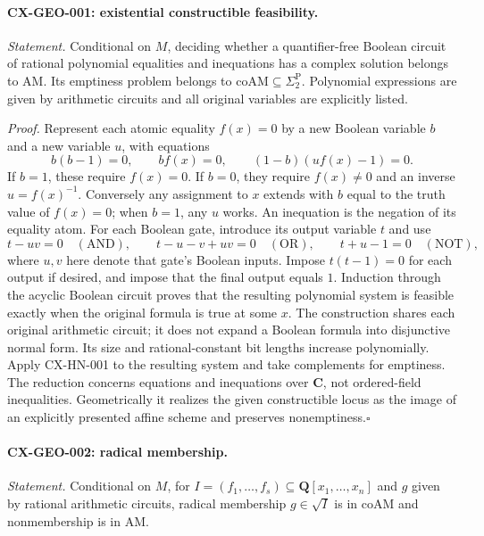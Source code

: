 \documentclass[11pt,a4paper]{article}
\begin{document}
\paragraph{CX-GEO-001: existential constructible feasibility.}
\emph{Statement.} Conditional on $M$, deciding whether a quantifier-free
Boolean circuit of rational polynomial equalities and inequations has a
complex solution belongs to $\mathrm{AM}$. Its emptiness problem belongs to
$\mathrm{coAM}\subseteq\Sigma_2^{\mathrm P}$. Polynomial expressions are
given by arithmetic circuits and all original variables are explicitly listed.

\emph{Proof.} Represent each atomic equality $f(x)=0$ by a new Boolean
variable $b$ and a new variable $u$, with equations
\[
 b(b-1)=0,\qquad bf(x)=0,\qquad (1-b)(u f(x)-1)=0.
\]
If $b=1$, these require $f(x)=0$. If $b=0$, they require $f(x)\ne0$
and an inverse $u=f(x)^{-1}$. Conversely any assignment to $x$ extends
with $b$ equal to the truth value of $f(x)=0$; when $b=1$, any $u$ works.
An inequation is the negation of its equality atom.
For each Boolean gate, introduce its output variable $t$ and use
\[
 t-uv=0\quad(\mathrm{AND}),\qquad
 t-u-v+uv=0\quad(\mathrm{OR}),\qquad
 t+u-1=0\quad(\mathrm{NOT}),
\]
where $u,v$ here denote that gate's Boolean inputs. Impose $t(t-1)=0$
for each output if desired, and impose that the final output equals $1$.
Induction through the acyclic Boolean circuit proves that the resulting
polynomial system is feasible exactly when the original formula is true
at some $x$. The construction shares each original arithmetic circuit;
it does not expand a Boolean formula into disjunctive normal form.
Its size and rational-constant bit lengths increase polynomially.
Apply CX-HN-001 to the resulting system and take complements for emptiness.
The reduction concerns equations and inequations over $\mathbf C$, not
ordered-field inequalities. Geometrically it realizes the given constructible
locus as the image of an explicitly presented affine scheme and preserves
nonemptiness.\hfill$\square$

\paragraph{CX-GEO-002: radical membership.}
\emph{Statement.} Conditional on $M$, for
$I=(f_1,\ldots,f_s)\subseteq\mathbf Q[x_1,\ldots,x_n]$ and $g$ given
by rational arithmetic circuits, radical membership $g\in\sqrt I$ is in
$\mathrm{coAM}$ and nonmembership is in $\mathrm{AM}$.
\end{document}
